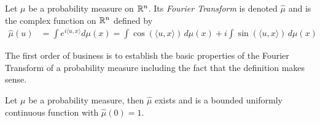 \begin{defn}Let $\mu$ be a probability measure on $\mathbb{R}^n$. Its
  \emph{Fourier Transform} is denoted $\hat{\mu}$ and is the complex function on
  $\mathbb{R}^n$ defined by 
\begin{align*}
\hat{\mu}(u) &= \int e^{i\langle u,x \rangle} d \mu(x) = \int \cos(\langle u,x \rangle)
\, d \mu(x) + i \int \sin(\langle u,x \rangle) \, d\mu(x)
\end{align*}
\end{defn}
The first order of business is to establish the basic properties of
the Fourier Transform of a probability measure including the fact that
the definition makes sense.
\begin{thm} \label{CharacteristicFunctionBoundedAndContinuous}Let $\mu$ be a probability measure, then $\hat{\mu}$
  exists and is a bounded uniformly continuous function with
  $\hat{\mu}(0) = 1$.
\end{thm}
